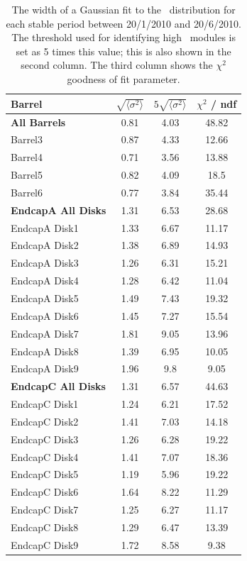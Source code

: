 \begin{table}[h]
 \centering
\begin{tabular}{ l  c  c  c }
\hline\hline
Barrel & $\sqrt{\langle \sigma ^ 2 \rangle }$ & $5\sqrt{\langle \sigma ^ 2 \rangle }$ & $\chi ^2$  / ndf\\
\hline
\textbf{All Barrels} & 0.81 & 4.03 & 48.82 \\
Barrel3 & 0.87 & 4.33 & 12.66 \\
Barrel4 & 0.71 & 3.56 & 13.88 \\
Barrel5 & 0.82 & 4.09 & 18.5 \\
Barrel6 & 0.77 & 3.84 & 35.44 \\
\hline
\textbf{EndcapA All Disks} & 1.31 & 6.53 & 28.68 \\
EndcapA Disk1 & 1.33 & 6.67 & 11.17 \\
EndcapA Disk2 & 1.38 & 6.89 & 14.93 \\
EndcapA Disk3 & 1.26 & 6.31 & 15.21 \\
EndcapA Disk4 & 1.28 & 6.42 & 11.04 \\
EndcapA Disk5 & 1.49 & 7.43 & 19.32 \\
EndcapA Disk6 & 1.45 & 7.27 & 15.54 \\
EndcapA Disk7 & 1.81 & 9.05 & 13.96 \\
EndcapA Disk8 & 1.39 & 6.95 & 10.05 \\
EndcapA Disk9 & 1.96 & 9.8 & 9.05 \\
\hline
\textbf{EndcapC All Disks} & 1.31 & 6.57 & 44.63 \\
EndcapC Disk1 & 1.24 & 6.21 & 17.52 \\
EndcapC Disk2 & 1.41 & 7.03 & 14.18 \\
EndcapC Disk3 & 1.26 & 6.28 & 19.22 \\
EndcapC Disk4 & 1.41 & 7.07 & 18.36 \\
EndcapC Disk5 & 1.19 & 5.96 & 19.22 \\
EndcapC Disk6 & 1.64 & 8.22 & 11.29 \\
EndcapC Disk7 & 1.25 & 6.27 & 11.17 \\
EndcapC Disk8 & 1.29 & 6.47 & 13.39 \\
EndcapC Disk9 & 1.72 & 8.58 & 9.38 \\
\hline\hline
\end{tabular}
\caption[The width of a Gaussian fit to the \tdiff\ distribution for each
stable period between 20/1/2010 and 20/6/2010.]
{The width of a Gaussian fit to the \tdiff\ distribution for each
stable period between 20/1/2010 and 20/6/2010. The threshold used for
identifying high \tdiff\ modules is set as 5 times this value; this is also shown
in the second column. The third column shows the $\chi^2$ goodness of fit
parameter.}
\label{table:tdiff_thresh}
\end{table}


